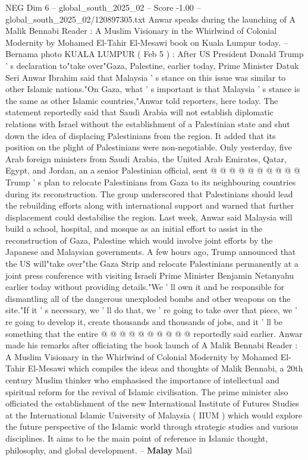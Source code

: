 \begin{textsample}{NEG Dim 6 – global\_south\_2025\_02 – Score -1.00 – global\_south\_2025\_02/120897305.txt}  \label{ex:f6_neg_044}
Anwar speaks during the launching of A Malik Bennabi Reader : A Muslim Visionary in the Whirlwind of Colonial Modernity by Mohamed El-Tahir El-Mesawi book on Kuala Lumpur today. -- Bernama photo KUALA LUMPUR ( Feb 5 ) : After US President Donald Trump ' s declaration to"take over"Gaza, Palestine, earlier today, Prime Minister Datuk Seri Anwar Ibrahim said that Malaysia ' s stance on this issue was similar to other Islamic nations."On Gaza, what ' s important is that Malaysia ' s stance is the same as other Islamic countries,"Anwar told reporters, here today.
The statement reportedly said that Saudi Arabia will not establish diplomatic relations with Israel without the establishment of a Palestinian state and shut down the idea of displacing Palestinians from the region.
It added that its position on the plight of Palestinians were non-negotiable.
Only yesterday, five Arab foreign ministers from Saudi Arabia, the United Arab Emirates, Qatar, Egypt, and Jordan, an a senior Palestinian official, sent @ @ @ @ @ @ @ @ @ @ Trump ' s plan to relocate Palestinians from Gaza to its neighbouring countries during its reconstruction.
The group underscored that Palestinians should lead the rebuilding efforts along with international support and warned that further displacement could destabilise the region.
Last week, Anwar said Malaysia will build a school, hospital, and mosque as an initial effort to assist in the reconstruction of Gaza, Palestine which would involve joint efforts by the Japanese and Malaysian governments.
A few hours ago, Trump announced that the US will"take over"the Gaza Strip and relocate Palestinians permanently at a joint press conference with visiting Israeli Prime Minister Benjamin Netanyahu earlier today without providing details."We ' ll own it and be responsible for dismantling all of the dangerous unexploded bombs and other weapons on the site."If it ' s necessary, we ' ll do that, we ' re going to take over that piece, we ' re going to develop it, create thousands and thousands of jobs, and it ' ll be something that the entire @ @ @ @ @ @ @ @ @ @ reportedly said earlier.
Anwar made his remarks after officiating the book launch of A Malik Bennabi Reader : A Muslim Visionary in the Whirlwind of Colonial Modernity by Mohamed El-Tahir El-Mesawi which compiles the ideas and thoughts of Malik Bennabi, a 20th century Muslim thinker who emphasised the importance of intellectual and spiritual reform for the revival of Islamic civilisation.
The prime minister also officiated the establishment of the new International Institute of Futures Studies at the International Islamic University of Malaysia ( IIUM ) which would explore the future perspective of the Islamic world through strategic studies and various disciplines.
It aims to be the main point of reference in Islamic thought, philosophy, and global development. -- \textbf{Malay} Mail

\end{textsample}
